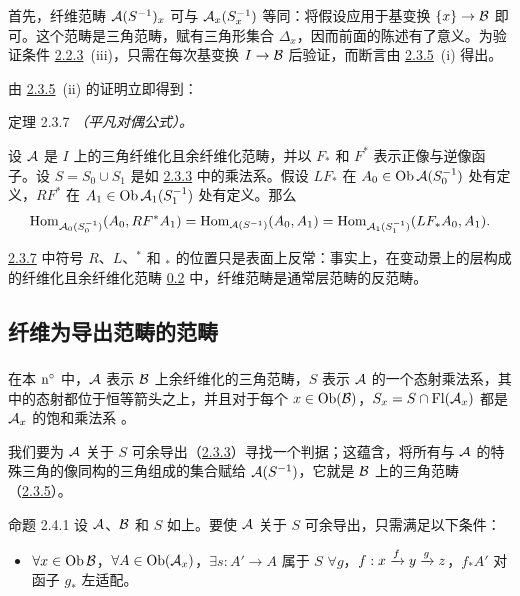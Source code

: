 首先，纤维范畴 $\Aa(S^{-1})_x$ 可与 $\Aa_x(S^{-1}_x)$ 等同：将假设应用于基变换 $\{x\}\rightarrow\Bb$ 即可。这个\pageoriginale 范畴是三角范畴，赋有三角形集合 $\Delta_x$，因而前面的陈述有了意义。为验证条件 \hyperref[XVII.def2.2.3]{2.2.3}~(iii)，只需在每次基变换 $I\rightarrow\Bb$ 后验证，而断言由 \hyperref[XVII.prop2.3.5]{2.3.5}~(i) 得出。

由 \hyperref[XVII.prop2.3.5]{2.3.5}~(ii) 的证明立即得到：

\begin{enonce*}{定理 2.3.7}
\emph{（平凡对偶公式）。}

设 $\Aa$ 是 $I$ 上的三角纤维化且余纤维化范畴，并以 $F_{\ast}$ 和 $F^{\ast}$ 表示正像与逆像函子。设 $S=S_0\cup S_1$ 是如 \hyperref[XVII.def2.3.3]{2.3.3} 中的乘法系。假设 $LF_{\ast}$ 在 $A_0\in\Ob\Aa(S^{-1}_0)$ 处有定义，$RF^{\ast}$ 在 $A_1\in\Ob\Aa_1(S^{-1}_1)$ 处有定义。那么
\[
\Hom_{\Aa_0(S^{-1}_0)}(A_0,RF^{\ast}A_1)=\Hom_{\Aa\sisi{_{(S^{-1})}}{(S^{-1})}}(A_0,A_1)=\Hom_{\Aa_1(S^{-1}_1)}(LF_{\ast}A_0,A_1){\quoi}.
\]
\end{enonce*}

\hyperref[XVII.thm2.3.7]{2.3.7} 中符号 $R$、$L$、${}^{\ast}$ 和 ${}_{\ast}$ 的位置只是表面上反常：事实上，在变动景上的层构成的纤维化且余纤维化范畴 \hyperlink{sga4.exp.XVII.subsection.0.2}{0.2} 中，纤维范畴是通常层范畴的反范畴。

\subsection{纤维为导出范畴的范畴}

\setcounter{subsubsection}{-1}
\subsubsection{}
在本 ${\rm n^{\circ}}$ 中，$\Aa$ 表示 $\Bb$ 上余纤维化的三角范畴，$S$ 表示 $\Aa$ 的一个态射乘法系，其中的态射都位于恒等箭头之上，并且对于每个 $x\in\Ob(\Bb)$，$S_x=S\cap\Fl(\Aa_x)$ 都是 $\Aa_x$ 的饱和乘法系 \cite[1.2.1]{sga4.exp.XVII.bib.CD}。

我们\pageoriginale 要为 $\Aa$ 关于 $S$ 可余导出（\hyperref[XVII.def2.3.3]{2.3.3}）寻找一个判据；这蕴含，将所有与 $\Aa$ 的特殊三角的像同构的三角组成的集合赋给 $\Aa(S^{-1})$，它就是 $\Bb$ 上的三角范畴（\hyperref[XVII.prop2.3.5]{2.3.5}）。

\begin{enonce*}{命题 2.4.1}
设 $\Aa$、$\Bb$ 和 $S$ 如上。要使 $\Aa$ 关于 $S$ 可余导出，只需满足以下条件：
\begin{itemize}
\item[$(\ast)$] $\forall x\in\Ob\Bb$，$\forall A\in\Ob(\Aa_x)$，$\exists s:A'\rightarrow A$ 属于 $S$ $\forall g$，$f:x\xrightarrow{f}y\xrightarrow{g}\sisi{Z}{z}$，$f_{\ast}A'$ 对函子 $g_{\ast}$ 左适配。
\end{itemize}
\end{enonce*}

